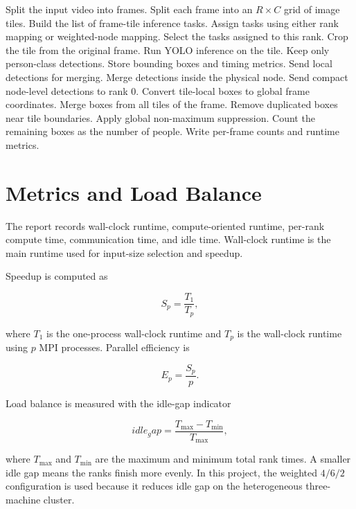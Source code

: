 \begin{algorithm}[H]
\caption{MPI YOLO People-Counting Pipeline}
\begin{algorithmic}[1]
\State Split the input video into frames.
\State Split each frame into an $R \times C$ grid of image tiles.
\State Build the list of frame-tile inference tasks.
\State Assign tasks using either rank mapping or weighted-node mapping.
\State Select the tasks assigned to this rank.
\State Crop the tile from the original frame.
\State Run YOLO inference on the tile.
\State Keep only person-class detections.
\State Store bounding boxes and timing metrics.
\EndFor
\State Send local detections for merging.
\EndFor
{}
\State Merge detections inside the physical node.
\State Send compact node-level detections to rank 0.
\EndIf
{}
\State Convert tile-local boxes to global frame coordinates.
\State Merge boxes from all tiles of the frame.
\State Remove duplicated boxes near tile boundaries.
\State Apply global non-maximum suppression.
\State Count the remaining boxes as the number of people.
\EndFor
\State Write per-frame counts and runtime metrics.
\EndIf
\end{algorithmic}
\end{algorithm}

\section{Metrics and Load Balance}

The report records wall-clock runtime, compute-oriented runtime, per-rank compute time, communication time, and idle time. Wall-clock runtime is the main runtime used for input-size selection and speedup.

Speedup is computed as

\[
S_p = \frac{T_1}{T_p},
\]

where $T_1$ is the one-process wall-clock runtime and $T_p$ is the wall-clock runtime using $p$ MPI processes. Parallel efficiency is

\[
E_p = \frac{S_p}{p}.
\]

Load balance is measured with the idle-gap indicator

\[
idle_gap = \frac{T_{\max} - T_{\min}}{T_{\max}},
\]

where $T_{\max}$ and $T_{\min}$ are the maximum and minimum total rank times. A smaller idle gap means the ranks finish more evenly. In this project, the weighted $4/6/2$ configuration is used because it reduces idle gap on the heterogeneous three-machine cluster.

